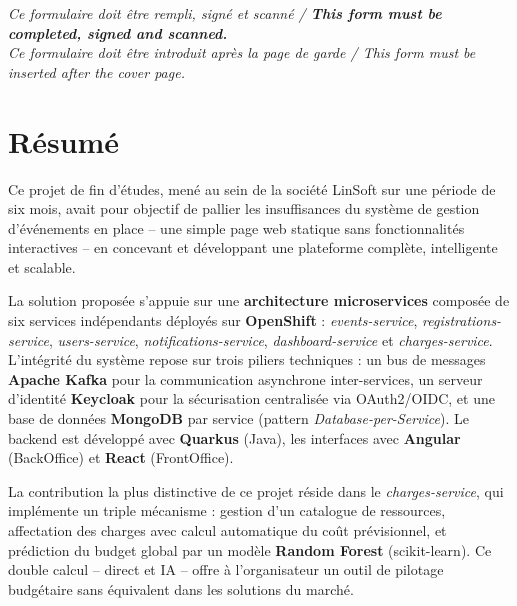 \documentclass[12pt,a4paper]{report}
\begin{document}
\vspace{1.5cm}
\begin{center}
{\small\itshape
Ce formulaire doit \^etre rempli, sign\'e et scann\'e /
\textbf{This form must be completed, signed and scanned.}\\[0.2cm]
Ce formulaire doit \^etre introduit apr\`es la page de garde /
This form must be inserted after the cover page.}
\end{center}

\newpage
\pagestyle{plain}

\chapter*{R\'esum\'e}

Ce projet de fin d'\'etudes, men\'e au sein de la soci\'et\'e LinSoft sur une p\'eriode de six mois,
avait pour objectif de pallier les insuffisances du syst\`eme de gestion d'\'ev\'enements en place
-- une simple page web statique sans fonctionnalit\'es interactives -- en concevant et
d\'eveloppant une plateforme compl\`ete, intelligente et scalable.

La solution propos\'ee s'appuie sur une \textbf{architecture microservices} compos\'ee de six
services ind\'ependants d\'eploy\'es sur \textbf{OpenShift} : \textit{events-service},
\textit{registrations-service}, \textit{users-service}, \textit{notifications-service},
\textit{dashboard-service} et \textit{charges-service}. L'int\'egrit\'e du syst\`eme repose sur
trois piliers techniques : un bus de messages \textbf{Apache Kafka} pour la communication
asynchrone inter-services, un serveur d'identit\'e \textbf{Keycloak} pour la s\'ecurisation
centralis\'ee via OAuth2/OIDC, et une base de donn\'ees \textbf{MongoDB} par service
(pattern \textit{Database-per-Service}). Le backend est d\'evelopp\'e avec \textbf{Quarkus}
(Java), les interfaces avec \textbf{Angular} (BackOffice) et \textbf{React} (FrontOffice).

La contribution la plus distinctive de ce projet r\'eside dans le \textit{charges-service},
qui impl\'emente un triple m\'ecanisme : gestion d'un catalogue de ressources, affectation des
charges avec calcul automatique du co\^ut pr\'evisionnel, et pr\'ediction du budget global par un
mod\`ele \textbf{Random Forest} (scikit-learn). Ce double calcul -- direct et IA -- offre \`a
l'organisateur un outil de pilotage budg\'etaire sans \'equivalent dans les solutions du march\'e.
\end{document}
